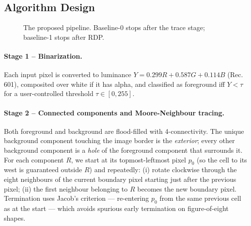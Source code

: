 \documentclass[twocolumn,a4paper,10pt]{article}
\begin{document}
\subsection{Algorithm Design}

\begin{figure}[h]
\centering
{}
\caption{The proposed pipeline.  Baseline-0 stops after the trace
         stage; baseline-1 stops after RDP.}
\label{fig:pipeline}
\end{figure}

\paragraph*{Stage 1 -- Binarization.}
Each input pixel is converted to luminance $Y = 0.299R + 0.587G +
0.114B$ (Rec.\,601), composited over white if it has alpha, and
classified as foreground iff $Y < \tau$ for a user-controlled
threshold $\tau \in [0,255]$.

\paragraph*{Stage 2 -- Connected components and Moore-Neighbour
tracing.}
Both foreground and background are flood-filled with 4-connectivity.
The unique background component touching the image border is the
\emph{exterior}; every other background component is a \emph{hole} of
the foreground component that surrounds it.  For each component $R$,
we start at its topmost-leftmost pixel $p_0$ (so the cell to its west
is guaranteed outside $R$) and repeatedly: (i) rotate clockwise
through the eight neighbours of the current boundary pixel starting
just after the previous pixel; (ii) the first neighbour belonging to
$R$ becomes the new boundary pixel.  Termination uses Jacob's
criterion --- re-entering $p_0$ from the same previous cell as at the
start --- which avoids spurious early termination on figure-of-eight
shapes.
\end{document}
